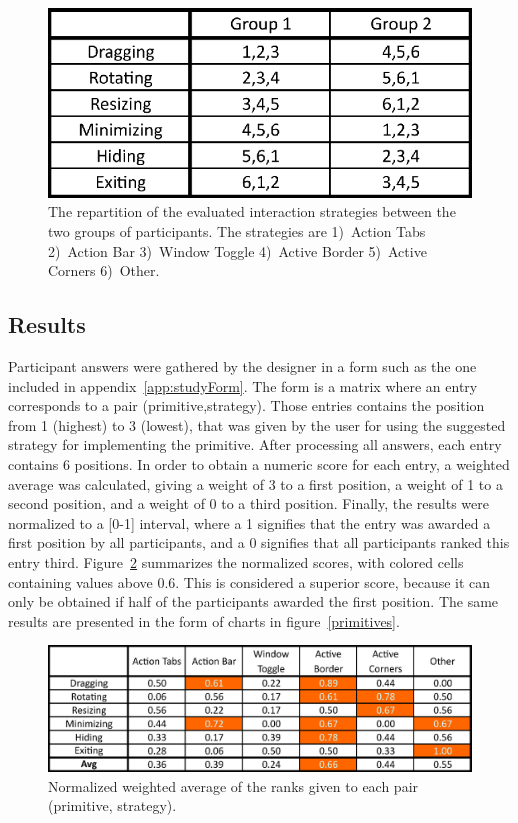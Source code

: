 \begin{figure}[htb]
  \centering
    \includegraphics[scale=1]{images/groups}
  \caption{The repartition of the evaluated interaction strategies between the two groups of participants. The strategies are 1)~Action Tabs 2)~Action Bar 3)~Window Toggle 4)~Active Border 5)~Active Corners 6)~Other.}
  \label{groups}
\end{figure}


\subsection{Results}

Participant answers were gathered by the designer in a form such as the one included in appendix~\ref{app:studyForm}.
The form is a matrix where an entry corresponds to a pair (primitive,strategy).
Those entries contains the position from 1 (highest) to 3 (lowest), that was given by the user for using the suggested strategy for implementing the primitive.
After processing all answers, each entry contains 6 positions.
In order to obtain a numeric score for each entry, a weighted average was calculated, giving a weight of 3 to a first position, a weight of 1 to a second position, and a weight of 0 to a third position.
Finally, the results were normalized to a [0-1] interval, where a 1 signifies that the entry was awarded a first position by all participants, and a 0 signifies that all participants ranked this entry third.
Figure~\ref{resultMatrix} summarizes the normalized scores, with colored cells containing values above 0.6.
This is considered a superior score, because it can only be obtained if half of the participants awarded the first position.
The same results are presented in the form of charts in figure~\ref{primitives}.

\begin{figure}[htb]
  \centering
    \includegraphics[scale=1]{images/resultMatrix}
  \caption{Normalized weighted average of the ranks given to each pair (primitive, strategy).}
  \label{resultMatrix}
\end{figure}

